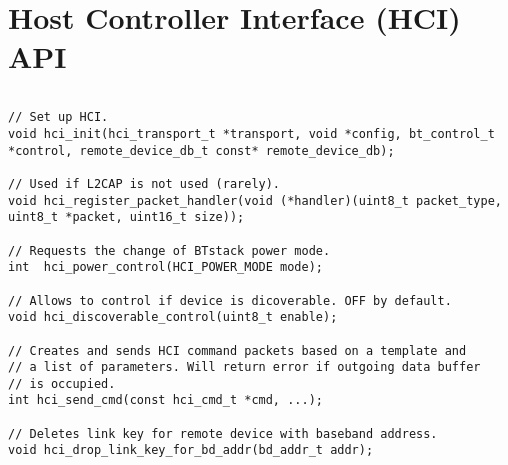 \section{Host Controller Interface (HCI) API}
\label{appendix:api_hci}
$ $
\begin{lstlisting}
// Set up HCI.
void hci_init(hci_transport_t *transport, void *config, bt_control_t *control, remote_device_db_t const* remote_device_db);

// Used if L2CAP is not used (rarely). 
void hci_register_packet_handler(void (*handler)(uint8_t packet_type, uint8_t *packet, uint16_t size));

// Requests the change of BTstack power mode.
int  hci_power_control(HCI_POWER_MODE mode);

// Allows to control if device is dicoverable. OFF by default.
void hci_discoverable_control(uint8_t enable);

// Creates and sends HCI command packets based on a template and 
// a list of parameters. Will return error if outgoing data buffer 
// is occupied. 
int hci_send_cmd(const hci_cmd_t *cmd, ...);

// Deletes link key for remote device with baseband address.
void hci_drop_link_key_for_bd_addr(bd_addr_t addr);
\end{lstlisting}
\pagebreak